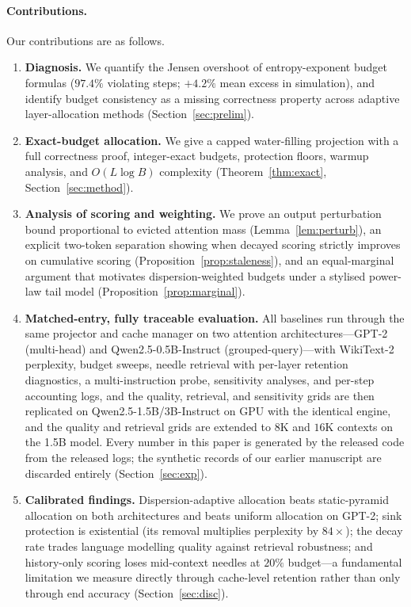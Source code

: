 \paragraph{Contributions.}
Our contributions are as follows.
\begin{enumerate}[leftmargin=1.6em,itemsep=2pt,topsep=3pt]
\item \textbf{Diagnosis.} We quantify the Jensen overshoot of
entropy-exponent budget formulas ($97.4\%$ violating steps; $+4.2\%$ mean
excess in simulation), and identify budget consistency as a missing
correctness property across adaptive layer-allocation methods
(Section~\ref{sec:prelim}).
\item \textbf{Exact-budget allocation.} We give a capped water-filling
projection with a full correctness proof, integer-exact budgets,
protection floors, warmup analysis, and $O(L\log B)$ complexity
(Theorem~\ref{thm:exact}, Section~\ref{sec:method}).
\item \textbf{Analysis of scoring and weighting.} We prove an output
perturbation bound proportional to evicted attention mass
(Lemma~\ref{lem:perturb}), an explicit two-token separation showing when
decayed scoring strictly improves on cumulative scoring
(Proposition~\ref{prop:staleness}), and an equal-marginal argument that
motivates dispersion-weighted budgets under a stylised power-law tail
model (Proposition~\ref{prop:marginal}).
\item \textbf{Matched-entry, fully traceable evaluation.} All baselines
run through the same projector and cache manager on two attention
architectures---GPT-2 (multi-head) and Qwen2.5-0.5B-Instruct
(grouped-query)---with WikiText-2 perplexity, budget sweeps, needle
retrieval with per-layer retention diagnostics, a multi-instruction
probe, sensitivity analyses, and per-step accounting logs, and the
quality, retrieval, and sensitivity grids are then replicated on
Qwen2.5-1.5B/3B-Instruct on GPU with the identical engine, and the
quality and retrieval grids are extended to $8$K and $16$K contexts on
the 1.5B model. Every number in
this paper is generated by the released code from the released logs; the
synthetic records of our earlier manuscript are discarded entirely
(Section~\ref{sec:exp}).
\item \textbf{Calibrated findings.} Dispersion-adaptive allocation beats
static-pyramid allocation on both architectures and beats uniform
allocation on GPT-2; sink protection is existential (its removal
multiplies perplexity by $84\times$); the decay rate trades language
modelling quality against retrieval robustness; and history-only scoring
loses mid-context needles at $20\%$ budget---a fundamental limitation we
measure directly through cache-level retention rather than only through
end accuracy (Section~\ref{sec:disc}).
\end{enumerate}


